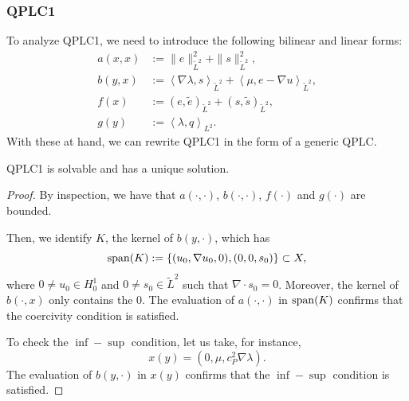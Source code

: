 \subsubsection{QPLC1}

To analyze QPLC1, we need to introduce the following bilinear and linear forms:
\begin{align}
    a(x,x) & := \|e\|^2_{\tilde{L}^2} + \|s\|^2_{\tilde{L}^2}, \\
    b(y,x) & := \left\langle \nabla \lambda, s\right\rangle_{\tilde{L}^2}+\left\langle \mu, e- \nabla u \right\rangle_{\tilde{L}^2}, \\
    f(x)   & := \left( e , \tilde{e} \right)_{\tilde{L}^2} + \left( s , \tilde{s} \right)_{\tilde{L}^2} , \\
    g(y)   & := \left\langle \lambda , q \right\rangle_{L^2}.
\end{align}
With these at hand, we can rewrite QPLC1 in the form of a generic QPLC.

\begin{proposition}
QPLC1 is solvable and has a unique solution.
\end{proposition}

\begin{proof}
By inspection, we have that $a(\cdot, \cdot)$, $b(\cdot, \cdot)$, $f(\cdot)$ and $g(\cdot)$ are bounded.

Then, we identify $K$, the kernel of $b(y, \cdot)$, which has
\begin{equation}
\operatorname{span}(K) := \left \{ (u_0, \nabla u_0, 0),(0, 0, s_0) \right \} \subset X,
\end{equation}
where $0 \neq u_0 \in H^1_0$ and $0 \neq s_0 \in \tilde{L}^2$ such that $\nabla \cdot s_0 = 0$. Moreover, the kernel of $b(\cdot, x)$ only contains the $0$. The evaluation of $a(\cdot,\cdot)$ in $\operatorname{span}(K)$ confirms that the coercivity condition is satisfied. 

To check the $\inf-\sup$ condition, let us take, for instance,
\begin{equation}
x(y) = \left(0, \mu, c_P^2\nabla \lambda\right).    
\end{equation}
The evaluation of $b(y,\cdot)$ in $x(y)$ confirms that the $\inf-\sup$ condition is satisfied.
\end{proof}

